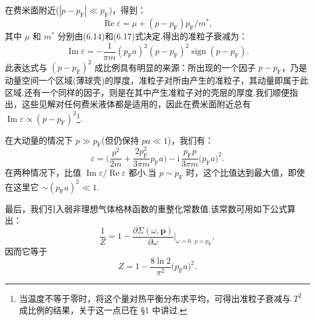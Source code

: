 在费米面附近($|p-p_{\mathrm{F}}|\ll p_{\mathrm{F}}$)，得到：
\begin{equation*}
  \operatorname{Re}\varepsilon=\mu+(p-p_{\mathrm{F}})p_{\mathrm{F}}/m^{*},
\end{equation*}
其中 $\mu$ 和 $m^{*}$ 分别由(6.14)和(6.17)式决定.得出的准粒子衰减为：
\begin{equation}
  \operatorname{Im}\varepsilon=-\frac{1}{\pi m}(p_{\mathrm{F}}a)^2(p-p_{\mathrm{F}})^2\operatorname{sign}(p-p_{\mathrm{F}}).
\end{equation}
此表达式与 $(p-p_{\mathrm{F}})^2$ 成比例具有明显的来源：所出现的一个因子 $p-p_{\mathrm{F}}$，乃是动量空间一个区域(薄球壳)的厚度，准粒子对所由产生的准粒子，其动量即属于此区域.还有一个同样的因子，则是在其中产生准粒子对的壳层的厚度.我们顺便指出，这些见解对任何费米液体都是适用的，因此在费米面附近总有 $\operatorname{Im}\varepsilon\propto(p-p_{\mathrm{F}})^2$\footnote{当温度不等于零时，将这个量对热平衡分布求平均，可得出准粒子衰减与 $T^2$ 成比例的结果，关于这一点已在 §1 中讲过.}.

在大动量的情况下 $p\gg p_{\mathrm{F}}$(但仍保持 $pa\ll1$)，我们有：
\begin{equation}
  \varepsilon=\biggl(\frac{p^2}{2m}+\frac{2p_{\mathrm{F}}^2}{3\pi m}p_{\mathrm{F}}a\biggr)-\mathrm{i}\,\frac{p_{\mathrm{F}}p}{3\pi m}\bigl(p_{\mathrm{F}}a\bigr)^2.
\end{equation}
在两种情况下，比值 $\operatorname{Im}\varepsilon/\operatorname{Re}\varepsilon$ 都小.当 $p\sim p_{\mathrm{F}}$ 时，这个比值达到最大值，即使在这里它 $\sim(p_{\mathrm{F}}a)^2\ll1$.

最后，我们引入弱非理想气体格林函数的重整化常数值.该常数可用如下公式算出：
\begin{equation*}
  \frac{1}{Z}=1-\frac{\partial\Sigma(\omega,\bm{p})}{\partial\omega}\bigg|_{\omega=0,\,p=p_{\mathrm{F}}},
\end{equation*}
因而它等于
\begin{equation}
  Z=1-\frac{8\ln 2}{\pi^2}\bigl(p_{\mathrm{F}}a\bigr)^2.
\end{equation}
